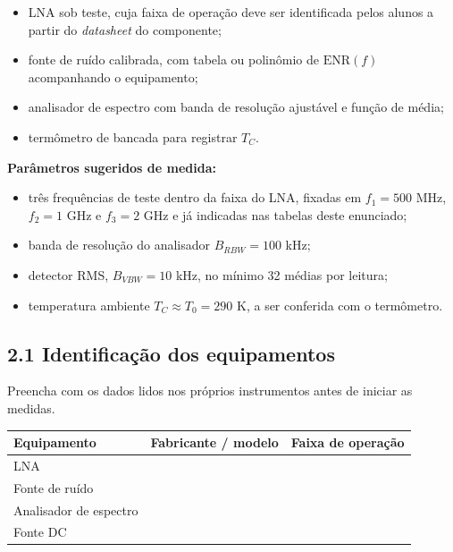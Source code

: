 \documentclass[11pt,a4paper]{article}
\begin{document}
\begin{instrucao}
\begin{itemize}[leftmargin=1.5em]
  \item LNA sob teste, cuja faixa de operação deve ser identificada pelos alunos a partir do \emph{datasheet} do componente;
  \item fonte de ruído calibrada, com tabela ou polinômio de $\mathrm{ENR}(f)$ acompanhando o equipamento;
  \item analisador de espectro com banda de resolução ajustável e função de média;
  \item termômetro de bancada para registrar $T_C$.
\end{itemize}
\end{instrucao}

\textbf{Parâmetros sugeridos de medida:}
\begin{itemize}[leftmargin=1.5em]
  \item três frequências de teste dentro da faixa do LNA, fixadas em $f_1 = 500$ MHz, $f_2 = 1$ GHz e $f_3 = 2$ GHz e já indicadas nas tabelas deste enunciado;
  \item banda de resolução do analisador $B_{RBW} = 100$ kHz;
  \item detector RMS, $B_{VBW} = 10$ kHz, no mínimo 32 médias por leitura;
  \item temperatura ambiente $T_C \approx T_0 = 290$ K, a ser conferida com o termômetro.
\end{itemize}

\subsection*{2.1 Identificação dos equipamentos}

Preencha com os dados lidos nos próprios instrumentos antes de iniciar as medidas.

{\renewcommand{\arraystretch}{1.6}
\begin{center}
\begin{tabular}{|l|p{4.5cm}|p{4.5cm}|}
\hline
\textbf{Equipamento} & \textbf{Fabricante / modelo} & \textbf{Faixa de operação} \\
\hline
LNA & & \\
\hline
Fonte de ruído & & \\
\hline
Analisador de espectro & & \\
\hline
Fonte DC & & \\
\hline
\end{tabular}
\end{center}
}
\end{document}
